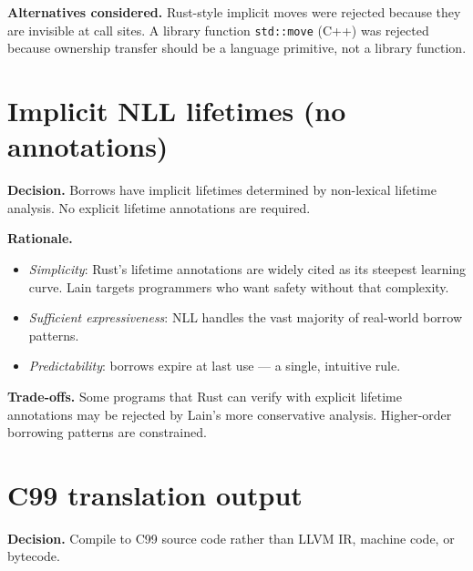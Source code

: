 \pnum
\textbf{Alternatives considered.}
Rust-style implicit moves were rejected because they are invisible at
call sites.  A library function \texttt{std::move} (C++) was rejected
because ownership transfer should be a language primitive, not a library
function.

\section{Implicit NLL lifetimes (no annotations)}
\label{sec:rationale.nll}

\pnum
\textbf{Decision.}  Borrows have implicit lifetimes determined by
non-lexical lifetime analysis.  No explicit lifetime annotations are
required.

\pnum
\textbf{Rationale.}
\begin{itemize}
  \item \textit{Simplicity}: Rust's lifetime annotations are widely
        cited as its steepest learning curve.  Lain targets programmers
        who want safety without that complexity.
  \item \textit{Sufficient expressiveness}: NLL handles the vast
        majority of real-world borrow patterns.
  \item \textit{Predictability}: borrows expire at last use — a single,
        intuitive rule.
\end{itemize}

\pnum
\textbf{Trade-offs.}  Some programs that Rust can verify with explicit
lifetime annotations may be rejected by Lain's more conservative
analysis.  Higher-order borrowing patterns are constrained.

\section{C99 translation output}
\label{sec:rationale.c99}

\pnum
\textbf{Decision.}  Compile to C99 source code rather than LLVM IR,
machine code, or bytecode.

